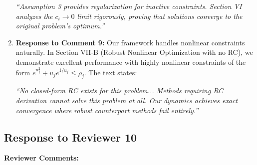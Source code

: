 \documentclass[journal,twoside,web]{ieeecolor}
\begin{document}
\begin{enumerate}
{\color{revisionblue}\textit{``Assumption 3 provides regularization for inactive constraints. Section VI analyzes the $c_i \to 0$ limit rigorously, proving that solutions converge to the original problem's optimum.''}}

\item \textbf{Response to Comment 9:} Our framework handles nonlinear constraints naturally. In Section VII-B (Robust Nonlinear Optimization with no RC), we demonstrate excellent performance with highly nonlinear constraints of the form $e^{u_j^2}+u_j e^{1/u_j} \leq \rho_j$. The text states:

{\color{revisionblue}\textit{``No closed-form RC exists for this problem... Methods requiring RC derivation cannot solve this problem at all. Our dynamics achieves exact convergence where robust counterpart methods fail entirely.''}}
\end{enumerate}

\newpage
\subsection*{Response to Reviewer 10}

\noindent\textbf{Reviewer Comments:}
\end{document}
